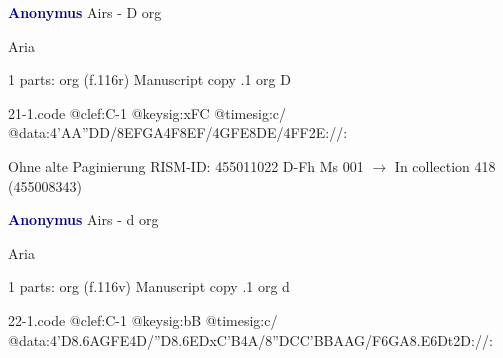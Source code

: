 \documentclass[twocolumn]{book}
\begin{document}
\newline \par \vspace{7pt} \textcolor{darkblue}{\textbf{Anonymus  }}
\newline Airs - D
\newline org
\newline \begin{itshape}[f.116r, heading:] Aria\end{itshape} 
\newline \textcolor{darkblue}{}  1 parts: org  (f.116r)
\newline Manuscript copy
.1  org  D  
\begin{filecontents*}{21-1.code}
@clef:C-1
@keysig:xFC
@timesig:c/
@data:4'AA''DD/{8EFGA}4F{8EF}/4GFE{8DE}/4FF2E://:
\end{filecontents*}
\newline
%

\newline Ohne alte Paginierung
\newline RISM-ID: 455011022
\newline D-Fh  Ms 001
\newline $\rightarrow$ In collection 418 (455008343)
      
\newline \par \vspace{7pt} \textcolor{darkblue}{\textbf{Anonymus  }}
\newline Airs - d
\newline org
\newline \begin{itshape}[f.116v, heading:] Aria\end{itshape} 
\newline \textcolor{darkblue}{}  1 parts: org  (f.116v)
\newline Manuscript copy
.1  org  d  
\begin{filecontents*}{22-1.code}
@clef:C-1
@keysig:bB
@timesig:c/
@data:4'D{8.6AG}{FE}4D/''D{8.6ED}{xC'B}4A/{8''DC}{C'B}{BA}{AG}/{F6GA}{8.E6Dt}2D://:
\end{filecontents*}
\newline
%
\end{document}

